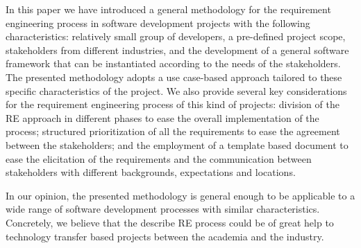 In this paper we have introduced a general methodology for the 
requirement engineering process in software development projects
with the following characteristics: relatively small group of
developers, a pre-defined project scope, stakeholders from
different industries, and the development of a general software
framework that can be instantiated according to the needs of the
stakeholders.  The presented methodology adopts a use case-based
approach tailored to these specific characteristics of the project.
We also provide several key considerations for the requirement
engineering process of this kind of projects: division of the RE
approach in different phases to ease the overall implementation of
the process; structured prioritization of all the requirements to
ease the agreement between the stakeholders; and the employment of
a template based document to ease the elicitation of the
requirements and the communication between stakeholders with
different backgrounds, expectations and locations.

In our opinion, the presented methodology is general enough to be 
applicable to a wide range of software development processes with 
similar characteristics. Concretely, we believe that the describe
RE process could be of great help to technology transfer based
projects between the academia and the industry.
